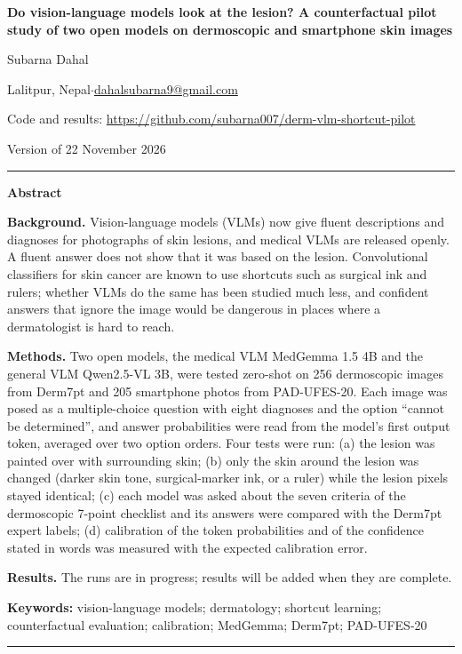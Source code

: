 \documentclass[11pt,a4paper]{article}
\newif\ifresults
\begin{document}
\begin{center}
{\LARGE\bfseries Do vision-language models look at the lesion? A counterfactual pilot study of two open models on dermoscopic and smartphone skin images\par}
\vspace{1.0em}
{\large Subarna Dahal\par}
\vspace{0.3em}
{\small Lalitpur, Nepal\quad$\cdot$\quad \href{mailto:dahalsubarna9@gmail.com}{dahalsubarna9@gmail.com}\par}
{\small Code and results: \url{https://github.com/subarna007/derm-vlm-shortcut-pilot}\par}
\vspace{0.3em}
{\small Version of 22 November 2026\par}
\end{center}
\vspace{0.4em}
\noindent\rule{\textwidth}{0.4pt}

{\small
\textbf{Abstract}

\textbf{Background.} Vision-language models (VLMs) now give fluent descriptions and diagnoses for photographs of skin lesions, and medical VLMs are released openly. A fluent answer does not show that it was based on the lesion. Convolutional classifiers for skin cancer are known to use shortcuts such as surgical ink and rulers; whether VLMs do the same has been studied much less, and confident answers that ignore the image would be dangerous in places where a dermatologist is hard to reach.

\textbf{Methods.} Two open models, the medical VLM MedGemma 1.5 4B and the general VLM Qwen2.5-VL 3B, were tested zero-shot on 256 dermoscopic images from Derm7pt and 205 smartphone photos from PAD-UFES-20. Each image was posed as a multiple-choice question with eight diagnoses and the option ``cannot be determined'', and answer probabilities were read from the model's first output token, averaged over two option orders. Four tests were run: (a) the lesion was painted over with surrounding skin; (b) only the skin around the lesion was changed (darker skin tone, surgical-marker ink, or a ruler) while the lesion pixels stayed identical; (c) each model was asked about the seven criteria of the dermoscopic 7-point checklist and its answers were compared with the Derm7pt expert labels; (d) calibration of the token probabilities and of the confidence stated in words was measured with the expected calibration error.

\ifresults
\textbf{Results.} 
\else
\textbf{Results.} The runs are in progress; results will be added when they are complete.
\fi

\textbf{Keywords:} vision-language models; dermatology; shortcut learning; counterfactual evaluation; calibration; MedGemma; Derm7pt; PAD-UFES-20\par
}
\noindent\rule{\textwidth}{0.4pt}
\end{document}
